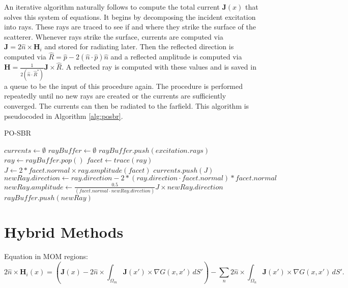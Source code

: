 \documentclass{article}
\theoremstyle{plain}
\begin{document}
An iterative algorithm naturally follows to compute the total current $\mathbf{J}(x)$ that solves this system of equations.
It begins by decomposing the incident excitation into rays.
These rays are traced to see if and where they strike the surface of the scatterer.
Whenever rays strike the surface, currents are computed via $\mathbf{J}=2\hat{n}\times \mathbf{H}_i$
and stored for radiating later.
Then the reflected direction is computed via $\hat{R} = \hat{p} - 2(\hat{n}\cdot\hat{p})\hat{n}$
and a reflected amplitude is computed via $\mathbf{H} = \frac{1}{2\left(\hat{n}\cdot\hat{R}^*\right)}\mathbf{J} \times \hat{R}$.
A reflected ray is computed with these values and is saved in a queue to be the input of this procedure again.
The procedure is performed repeatedly until no new rays are created or the currents are sufficiently converged.
The currents can then be radiated to the farfield. This algorithm is pseudocoded in Algorithm \ref{alg:posbr}.
\begin{algorithm}
\caption{PO-SBR}\label{alg:posbr}
\begin{algorithmic}[1]
\State $currents \gets \emptyset$
\State $rayBuffer \gets \emptyset$
\State $rayBuffer.push( excitation.rays )$
\State $ray \gets rayBuffer.pop()$
\State $facet \gets trace(ray)$
    \State $J \gets 2*facet.normal \times ray.amplitude(facet)$
    \State $currents.push(J)$
    \State $newRay.direction \gets ray.direction - 2*(ray.direction \cdot facet.normal)*facet.normal$
    \State $newRay.amplitude \gets \frac{0.5}{\left(facet.normal\cdot newRay.direction\right)} J \times newRay.direction$
    \State $rayBuffer.push( newRay )$
\EndIf
\EndWhile
\end{algorithmic}
\end{algorithm}




\section{Hybrid Methods}

Equation in MOM regions:
\begin{equation}
	2\hat{n}\times\mathbf{H}_i(x)
	= \left( \mathbf{J}(x)
	- 2\hat{n}\times\int_{\Omega_m} \mathbf{J}(x') \times \nabla G(x,x') \,dS'\right)
	- \sum_n 2\hat{n}\times\int_{\Omega_n} \mathbf{J}(x') \times \nabla G(x,x') \,dS'.
\end{equation}
\end{document}
